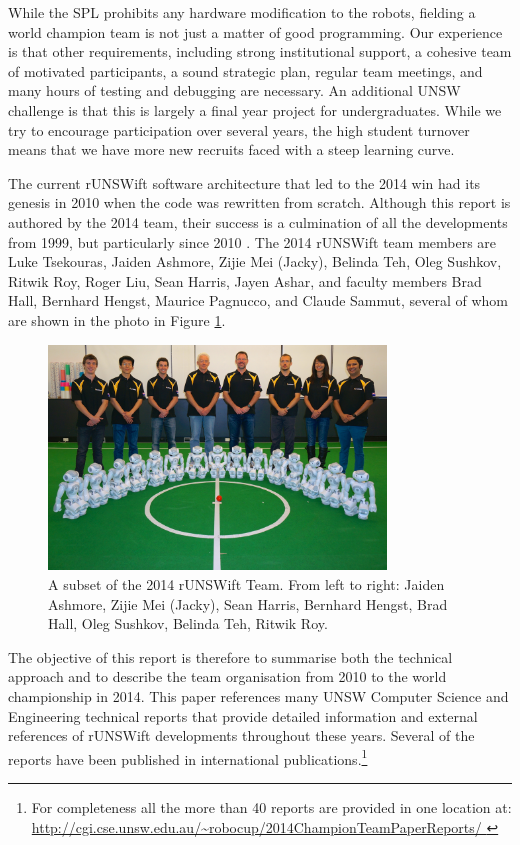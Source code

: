 \documentclass[runningheads,a4paper]{llncs}
\begin{document}
While the SPL prohibits any hardware modification to the robots, fielding a world champion team is not just a matter of good programming. Our experience is that other requirements, including strong institutional support, a cohesive team of motivated participants, a sound strategic plan, regular team meetings, and many hours of testing and debugging are necessary. An additional UNSW challenge is that this is largely a final year project for undergraduates. While we try to encourage participation over several years, the high student turnover means that we have more new recruits faced with a steep learning curve.  

The current rUNSWift software architecture that led to the 2014 win had its genesis in 2010 when the code was rewritten from scratch. Although this report is authored by the 2014 team, their success is a culmination of all the developments from 1999, but particularly since 2010 \cite{tsekouras2014runswift}. The 2014 rUNSWift team members are Luke Tsekouras, Jaiden Ashmore, Zijie Mei (Jacky), Belinda Teh, Oleg Sushkov, Ritwik Roy, Roger Liu, Sean Harris, Jayen Ashar, and faculty members Brad Hall, Bernhard Hengst, Maurice Pagnucco, and Claude Sammut,  several of whom are shown in the photo in Figure \ref{figTeamPhoto2014}.

\begin{figure}
\centering
\includegraphics[width=0.8\textwidth]{Figures/figTeamPhoto2014}
\caption{A subset of the 2014 rUNSWift Team. From left to right: Jaiden Ashmore, Zijie Mei (Jacky), Sean Harris, Bernhard Hengst, Brad Hall, Oleg Sushkov, Belinda Teh, Ritwik Roy.} \label{figTeamPhoto2014}
\end{figure}

The objective of this report is therefore to summarise both the technical approach and to describe the team organisation from 2010 to the world championship in 2014. This paper references many UNSW Computer Science and Engineering technical reports that provide detailed information and external references of rUNSWift developments throughout these years. Several of the reports have been published in international publications.\footnote{For completeness all the more than 40 reports are provided in one location at: \\ \url{ http://cgi.cse.unsw.edu.au/~robocup/2014ChampionTeamPaperReports/ }}
\end{document}
